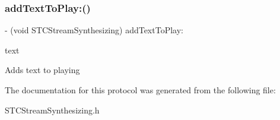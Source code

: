 \subsubsection{\texorpdfstring{add\+Text\+To\+Play\+:()}{addTextToPlay:()}}
{\footnotesize\ttfamily -\/ (void S\+T\+C\+Stream\+Synthesizing) add\+Text\+To\+Play\+: \begin{DoxyParamCaption}\item[{(N\+S\+String $\ast$)}]{text }\end{DoxyParamCaption}}

Adds text to playing 

The documentation for this protocol was generated from the following file\+:\begin{DoxyCompactItemize}
\item 
S\+T\+C\+Stream\+Synthesizing.\+h\end{DoxyCompactItemize}

